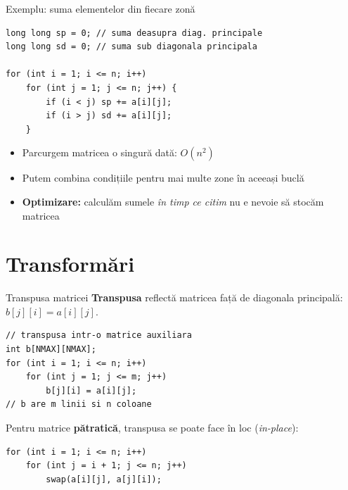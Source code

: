 ﻿\documentclass{beamer}
\begin{document}
\begin{frame}[fragile]{Exemplu: suma elementelor din fiecare zonă}
  \begin{lstlisting}
long long sp = 0; // suma deasupra diag. principale
long long sd = 0; // suma sub diagonala principala

for (int i = 1; i <= n; i++)
    for (int j = 1; j <= n; j++) {
        if (i < j) sp += a[i][j];
        if (i > j) sd += a[i][j];
    }
  \end{lstlisting}

  \begin{itemize}
    \item Parcurgem matricea o singură dată: $O(n^2)$
    \item Putem combina condițiile pentru mai multe zone în aceeași buclă
    \item \textbf{Optimizare:} calculăm sumele \emph{în timp ce citim} \textemdash{} nu e nevoie să stocăm matricea
  \end{itemize}
\end{frame}

\section{Transformări}

\begin{frame}[fragile]{Transpusa matricei}
  \textbf{Transpusa} reflectă matricea față de diagonala principală: $b[j][i] = a[i][j]$.

  \begin{lstlisting}
// transpusa intr-o matrice auxiliara
int b[NMAX][NMAX];
for (int i = 1; i <= n; i++)
    for (int j = 1; j <= m; j++)
        b[j][i] = a[i][j];
// b are m linii si n coloane
  \end{lstlisting}

  \smallskip
  Pentru matrice \textbf{pătratică}, transpusa se poate face în loc (\emph{in-place}):
  \begin{lstlisting}
for (int i = 1; i <= n; i++)
    for (int j = i + 1; j <= n; j++)
        swap(a[i][j], a[j][i]);
  \end{lstlisting}
\end{frame}
\end{document}
